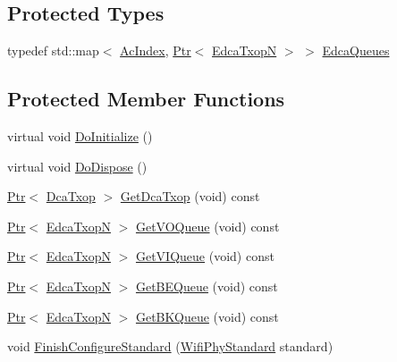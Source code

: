 \subsection*{Protected Types}
\begin{DoxyCompactItemize}
\item 
typedef std\+::map$<$ \hyperlink{group__wifi_gab422b4562ba272b39a9b6bca3513f3ac}{Ac\+Index}, \hyperlink{classns3_1_1Ptr}{Ptr}$<$ \hyperlink{classns3_1_1EdcaTxopN}{Edca\+TxopN} $>$ $>$ \hyperlink{classns3_1_1RegularWifiMac_af5fd1332c45fb685ed18480b8f73d6b8}{Edca\+Queues}
\end{DoxyCompactItemize}
\subsection*{Protected Member Functions}
\begin{DoxyCompactItemize}
\item 
virtual void \hyperlink{classns3_1_1RegularWifiMac_ae034e83c1704ac081981e475607f9a37}{Do\+Initialize} ()
\item 
virtual void \hyperlink{classns3_1_1RegularWifiMac_aaa1859a22112b2d594ac9d6f19fecfac}{Do\+Dispose} ()
\item 
\hyperlink{classns3_1_1Ptr}{Ptr}$<$ \hyperlink{classns3_1_1DcaTxop}{Dca\+Txop} $>$ \hyperlink{classns3_1_1RegularWifiMac_aad5cb47bce94b2deafb52a6d39b0a172}{Get\+Dca\+Txop} (void) const 
\item 
\hyperlink{classns3_1_1Ptr}{Ptr}$<$ \hyperlink{classns3_1_1EdcaTxopN}{Edca\+TxopN} $>$ \hyperlink{classns3_1_1RegularWifiMac_af762e3e828819033fd37d533174047e3}{Get\+V\+O\+Queue} (void) const 
\item 
\hyperlink{classns3_1_1Ptr}{Ptr}$<$ \hyperlink{classns3_1_1EdcaTxopN}{Edca\+TxopN} $>$ \hyperlink{classns3_1_1RegularWifiMac_afc644c868a54ac3f20c3312efa9db472}{Get\+V\+I\+Queue} (void) const 
\item 
\hyperlink{classns3_1_1Ptr}{Ptr}$<$ \hyperlink{classns3_1_1EdcaTxopN}{Edca\+TxopN} $>$ \hyperlink{classns3_1_1RegularWifiMac_a4d74298f820e686659ef42bc07a68f7e}{Get\+B\+E\+Queue} (void) const 
\item 
\hyperlink{classns3_1_1Ptr}{Ptr}$<$ \hyperlink{classns3_1_1EdcaTxopN}{Edca\+TxopN} $>$ \hyperlink{classns3_1_1RegularWifiMac_acbaa021944886a32380803d17564cb15}{Get\+B\+K\+Queue} (void) const 
\item 
void \hyperlink{classns3_1_1RegularWifiMac_aa023d7c243c107c737d0a7acf865f066}{Finish\+Configure\+Standard} (\hyperlink{group__wifi_ga1299834f4e1c615af3ca738033b76a49}{Wifi\+Phy\+Standard} standard)

\end{DoxyCompactItemize}
